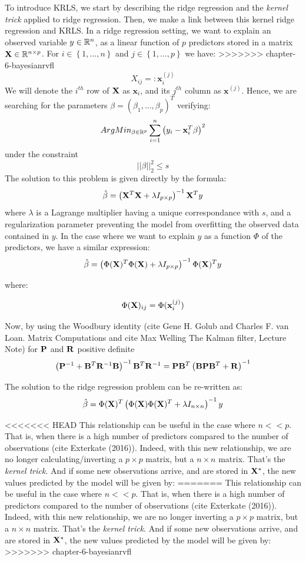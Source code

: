 \medskip

To introduce KRLS, we start by describing the ridge regression \cite{hoerl1970ridge} and the {\it kernel trick} applied to ridge regression. Then, we make a link between this kernel ridge regression and KRLS. In a ridge regression setting, we want to explain an observed variable $y \in \mathbb{R}^n$, as a linear function of $p$ predictors stored in a matrix ${\bf X} \in \mathbb{R}^{n \times p}$. For $i \in \left \lbrace 1, \ldots, n \right \rbrace $ and $j \in \left \lbrace1, \ldots, p \right \rbrace$ we have:
>>>>>>> chapter-6-bayesianrvfl
$$
X_{ij} =: \textbf{x}_i^{(j)}
$$
We will denote the $i^{th}$ row of ${\bf X}$ as $\textbf{x}_i$, and its $j^{th}$ column as $\textbf{x}^{(j)}$. Hence, we are searching for the parameters $\beta = \left(\beta_1, \ldots, \beta_p \right)^T$ verifying:
$$
ArgMin_{\beta \in \mathbb{R}^p} \sum_{i = 1}^n \left( y_i - \textbf{x}_i^T {\bf \beta} \right)^2
$$
under the constraint
$$
||\beta ||^2_2 \leq s
$$
The solution to this problem is given directly by the formula:
$$
\hat{\beta} = \left( {\bf X}^T {\bf X} + \lambda I_{p \times p} \right)^{-1}{\bf X}^T y
$$
where $\lambda$ is a Lagrange multiplier having a unique correspondance with $s$, and a regularization parameter preventing the model from overfitting the observed data contained in $y$. In the case where we want to explain $y$ as a function $\Phi$ of the predictors, we have a similar expression:
$$
\hat{\beta} = \left( \Phi({\bf X})^T \Phi({\bf X}) + \lambda I_{p \times p} \right)^{-1}\Phi({\bf X})^T y
$$

where:

$$
\Phi({\bf X})_{ij} = \Phi(\textbf{x}_i^{(j)})
$$

\medskip

Now, by using the Woodbury identity (cite Gene H. Golub and Charles F. van Loan. Matrix Computations and cite Max Welling The Kalman filter, Lecture Note) for ${\bf P}$ and ${\bf R}$ positive definite
$$
\left({\bf P}^{-1} + {\bf B}^T {\bf R}^{-1} {\bf B} \right)^{-1}{\bf B}^T {\bf R}^{-1} =
{\bf P}{\bf B}^T \left( {\bf B} {\bf P} {\bf B}^T + {\bf R}\right)^{-1}
$$

The solution to the ridge regression problem can be re-written as:
$$
\hat{\beta} = \Phi({\bf X})^T \left( \Phi({\bf X})\Phi({\bf X})^T + \lambda I_{n \times n} \right)^{-1} y
$$

<<<<<<< HEAD
This relationship can be useful in the case where $n << p$. That is, when there is a high number of predictors compared to the number of observations (cite Exterkate (2016)). Indeed, with this new relationship, we are no longer calculating/inverting a $p \times p$ matrix, but a $n \times n$ matrix. That's the {\it kernel trick}. And if some new observations arrive, and are stored in ${\bf X^*}$, the new values predicted by the model will be given by:
=======
This relationship can be useful in the case where $n << p$. That is, when there is a high number of predictors compared to the number of observations (cite Exterkate (2016)). Indeed, with this new relationship, we are no longer inverting a $p \times p$ matrix, but a $n \times n$ matrix. That's the {\it kernel trick}. And if some new observations arrive, and are stored in ${\bf X^*}$, the new values predicted by the model will be given by:
>>>>>>> chapter-6-bayesianrvfl


